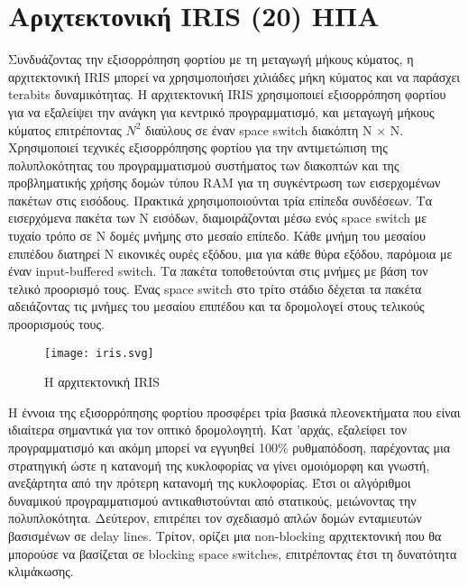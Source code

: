 ﻿
\section{Αριχτεκτονική IRIS (20) ΗΠΑ}


Συνδυάζοντας την εξισορρόπηση φορτίου με τη μεταγωγή μήκους κύματος, η
αρχιτεκτονική IRIS μπορεί να χρησιμοποιήσει χιλιάδες μήκη κύματος και
να παράσχει terabits δυναμικότητας. Η αρχιτεκτονική IRIS χρησιμοποιεί
εξισορρόπηση φορτίου για να εξαλείψει την ανάγκη για κεντρικό
προγραμματισμό, και μεταγωγή μήκους κύματος επιτρέποντας $N^2$
διαύλους σε έναν space switch διακόπτη N × N. Xρησιμοποιεί τεχνικές
εξισορρόπησης φορτίου για την αντιμετώπιση της πολυπλοκότητας του
προγραμματισμού συστήματος των διακοπτών και της προβληματικής χρήσης
δομών τύπου RAM για τη συγκέντρωση των εισερχομένων πακέτων στις
εισόδους. Πρακτικά χρησιμοποιούνται τρία επίπεδα συνδέσεων. Τα
εισερχόμενα πακέτα των N εισόδων, διαμοιράζονται μέσω ενός space
switch με τυχαίο τρόπο σε Ν δομές μνήμης στο μεσαίο επίπεδο. Κάθε
μνήμη του μεσαίου επιπέδου διατηρεί Ν εικονικές ουρές εξόδου, μια για
κάθε θύρα εξόδου, παρόμοια με έναν input-buffered switch. Τα πακέτα
τοποθετούνται στις μνήμες με βάση τον τελικό προορισμό τους. Ένας
space switch στο τρίτο στάδιο δέχεται τα πακέτα αδειάζοντας τις μνήμες
του μεσαίου επιπέδου και τα δρομολογεί στους τελικούς προορισμούς
τους.

\begin{figure}[h]
  \centering
  \texttt{[image: iris.svg]}
  \caption{Η αρχιτεκτονική IRIS}
  \label{fig:iris}
\end{figure}

H έννοια της εξισορρόπησης φορτίου προσφέρει τρία βασικά πλεονεκτήματα
που είναι ιδιαίτερα σημαντικά για τον οπτικό δρομολογητή. Κατ 'αρχάς,
εξαλείφει τον προγραμματισμό και ακόμη μπορεί να εγγυηθεί 100\%
ρυθμαπόδοση, παρέχοντας μια στρατηγική ώστε η κατανομή της κυκλοφορίας
να γίνει ομοιόμορφη και γνωστή, ανεξάρτητα από την πρότερη κατανομή
της κυκλοφορίας. Έτσι οι αλγόριθμοι δυναμικού προγραμματισμού
αντικαθιστούνται από στατικούς, μειώνοντας την
πολυπλοκότητα. Δεύτερον, επιτρέπει τον σχεδιασμό απλών δομών ενταμιευτών
βασισμένων σε delay lines. Τρίτον, ορίζει μια non-blocking
αρχιτεκτονική που θα μπορούσε να βασίζεται σε blocking space switches,
επιτρέποντας έτσι τη δυνατότητα κλιμάκωσης.

